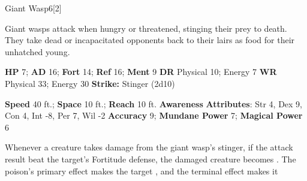   \begin{monsection}{Giant Wasp}{6}[2]
    \vspace{-1em}\vspace{-1em}
    \vspace{0em}

    
      Giant wasps attack when hungry or threatened, stinging their prey to death.
      They take dead or incapacitated opponents back to their lairs as food for their unhatched young.
    

    \begin{spellcontent}
      \begin{spelltargetinginfo}
        \pari \textbf{HP} 7;
          \textbf{AD} 16;
          \textbf{Fort} 14;
          \textbf{Ref} 16;
          \textbf{Ment} 9
        \pari \textbf{DR} Physical 10; Energy 7
        \pari \textbf{WR} Physical 33; Energy 30
        \pari \textbf{Strike:}
            Stinger  (2d10)
      \end{spelltargetinginfo}
    \end{spellcontent}
    \begin{monsterfooter}
      \pari \textbf{Speed} 40 ft.;
        \textbf{Space} 10 ft.;
        \textbf{Reach} 10 ft.
      \pari \textbf{Awareness} 
      \pari \textbf{Attributes}:
        Str 4, Dex 9,
        Con 4, Int -8,
        Per 7, Wil -2
      \pari \textbf{Accuracy} 9;
        \textbf{Mundane Power} 7;
      \textbf{Magical Power} 6
    \end{monsterfooter}
  \end{monsection}
    Whenever a creature takes damage from the giant wasp's stinger,
      if the attack result beat the target's Fortitude defense,
      the damaged creature becomes .
    The poison's primary effect makes the target , and the terminal effect makes it 
  
